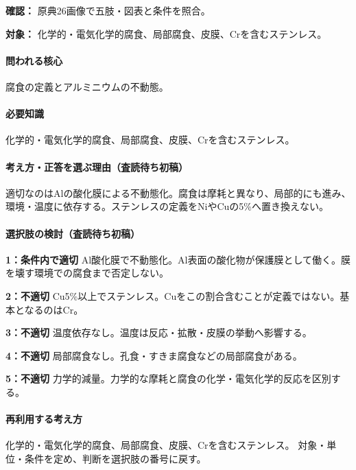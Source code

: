 \noindent\textbf{確認：} 原典26画像で五肢・図表と条件を照合。\par

\noindent\textbf{対象：} 化学的・電気化学的腐食、局部腐食、皮膜、Crを含むステンレス。\par

\paragraph{問われる核心} 腐食の定義とアルミニウムの不動態。

\paragraph{必要知識} 化学的・電気化学的腐食、局部腐食、皮膜、Crを含むステンレス。

\paragraph{考え方・正答を選ぶ理由（査読待ち初稿）} 適切なのはAlの酸化膜による不動態化。腐食は摩耗と異なり、局部的にも進み、環境・温度に依存する。ステンレスの定義をNiやCuの5\%へ置き換えない。

\paragraph{選択肢の検討（査読待ち初稿）}\mbox{}\par

\noindent\textbf{1：条件内で適切} Al酸化膜で不動態化。Al表面の酸化物が保護膜として働く。膜を壊す環境での腐食まで否定しない。\par

\noindent\textbf{2：不適切} Cu5\%以上でステンレス。Cuをこの割合含むことが定義ではない。基本となるのはCr。\par

\noindent\textbf{3：不適切} 温度依存なし。温度は反応・拡散・皮膜の挙動へ影響する。\par

\noindent\textbf{4：不適切} 局部腐食なし。孔食・すきま腐食などの局部腐食がある。\par

\noindent\textbf{5：不適切} 力学的減量。力学的な摩耗と腐食の化学・電気化学的反応を区別する。\par

\paragraph{再利用する考え方} 化学的・電気化学的腐食、局部腐食、皮膜、Crを含むステンレス。 対象・単位・条件を定め、判断を選択肢の番号に戻す。

